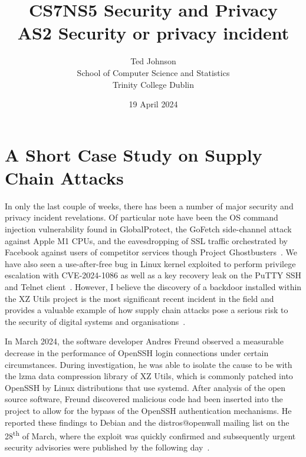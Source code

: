 \documentclass[a4paper,oneside,12pt]{article}
\title{CS7NS5 Security and Privacy\\AS2 Security or privacy incident}
\author{Ted Johnson\\School of Computer Science and Statistics\\Trinity College Dublin}
\date{19 April 2024}
\begin{document}
\maketitle
\onehalfspacing
\raggedright

\section*{A Short Case Study on Supply Chain Attacks}

In only the last couple of weeks, there has been a number of major security and privacy incident revelations. Of particular note have been the OS command injection vulnerability found in GlobalProtect, the GoFetch side-channel attack against Apple M1 CPUs, and the eavesdropping of SSL traffic orchestrated by Facebook against users of competitor services though Project Ghostbusters~\cite{CVE-2024-3400, gofetch, 369872}. We have also seen a use-after-free bug in Linux kernel exploited to perform privilege escalation with CVE-2024-1086 as well as a key recovery leak on the PuTTY SSH and Telnet client~\cite{CVE-2024-1086, CVE-2024-31497}. However, I believe the discovery of a backdoor installed within the XZ Utils project is the most significant recent incident in the field and provides a valuable example of how supply chain attacks pose a serious risk to the security of digital systems and organisations~\cite{CVE-2024-3094}.

In March 2024, the software developer Andres Freund observed a measurable decrease in the performance of OpenSSH login connections under certain circumstances. During investigation, he was able to isolate the cause to be with the lzma data compression library of XZ Utils, which is commonly patched into OpenSSH by Linux distributions that use systemd. After analysis of the open source software, Freund discovered malicious code had been inserted into the project to allow for the bypass of the OpenSSH authentication mechanisms. He reported these findings to Debian and the distros@openwall mailing list on the 28\textsuperscript{th} of March, where the exploit was quickly confirmed and subsequently urgent security advisories were published by the following day~\cite{freund-email, LWN-967180}.
\end{document}
